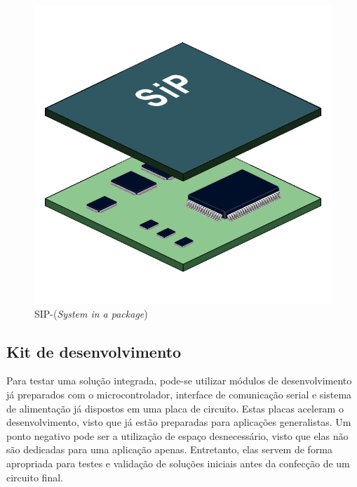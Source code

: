 \begin{figure}[h!]
  \caption{SIP-(\textit{System in a package})}
  \begin{center}
      \includegraphics[scale=0.2]{img/System_in_package.png}
  \end{center}
  \label{fig:SIP}
\end{figure}

\subsection{Kit de desenvolvimento}
Para testar uma solução integrada, pode-se utilizar módulos de desenvolvimento já preparados com o microcontrolador, interface de comunicação serial e sistema de alimentação já dispostos em uma placa de circuito. Estas placas aceleram o desenvolvimento, visto que já estão preparadas para aplicações generalistas. Um ponto negativo pode ser a utilização de espaço desnecessário, visto que elas não são dedicadas para uma aplicação apenas. Entretanto, elas servem de forma apropriada para testes e validação de soluções iniciais antes da confecção de um circuito final.
